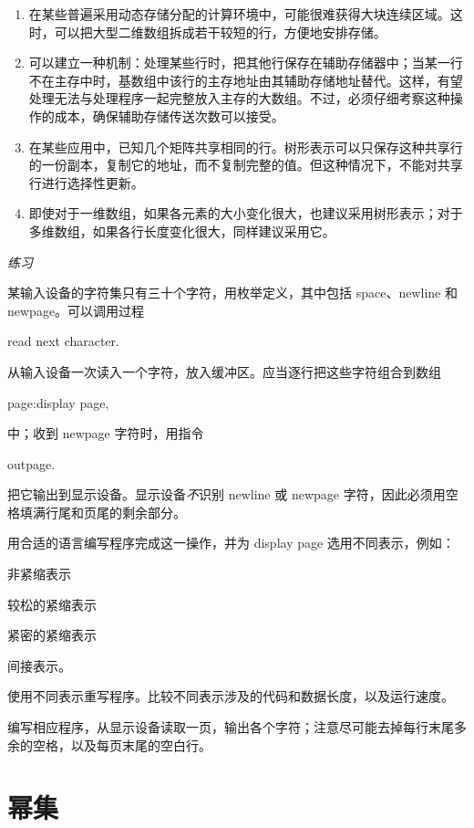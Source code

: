 \begin{enumerate}[wide, nosep, label=(\arabic*)]
	\item 在某些普遍采用动态存储分配的计算环境中，可能很难获得大块连续区域。这时，可以把大型二维数组拆成若干较短的行，方便地安排存储。

	\item 可以建立一种机制：处理某些行时，把其他行保存在辅助存储器中；当某一行不在主存中时，基数组中该行的主存地址由其辅助存储地址替代。这样，有望处理无法与处理程序一起完整放入主存的大数组。不过，必须仔细考察这种操作的成本，确保辅助存储传送次数可以接受。

	\item 在某些应用中，已知几个矩阵共享相同的行。树形表示可以只保存这种共享行的一份副本，复制它的地址，而不复制完整的值。但这种情况下，不能对共享行进行选择性更新。

	\item 即使对于一维数组，如果各元素的大小变化很大，也建议采用树形表示；对于多维数组，如果各行长度变化很大，同样建议采用它。
\end{enumerate}

\noindent
\textit{练习}
\nopagebreak

\noindent
某输入设备的字符集只有三十个字符，用枚举定义，其中包括 space、newline 和 newpage。可以调用过程

\quad read next character.

\noindent
从输入设备一次读入一个字符，放入缓冲区。应当逐行把这些字符组合到数组

\quad page:display page,

\noindent
中；收到 newpage 字符时，用指令

\quad outpage.

\noindent
把它输出到显示设备。显示设备\textit{不}识别 newline 或 newpage 字符，因此必须用空格填满行尾和页尾的剩余部分。

用合适的语言编写程序完成这一操作，并为 display page 选用不同表示，例如：

\quad 非紧缩表示

\quad 较松的紧缩表示

\quad 紧密的紧缩表示

\quad 间接表示。

\noindent
使用不同表示重写程序。比较不同表示涉及的代码和数据长度，以及运行速度。

编写相应程序，从显示设备读取一页，输出各个字符；注意尽可能去掉每行末尾多余的空格，以及每页末尾的空白行。
\section[幂集]{幂集}

